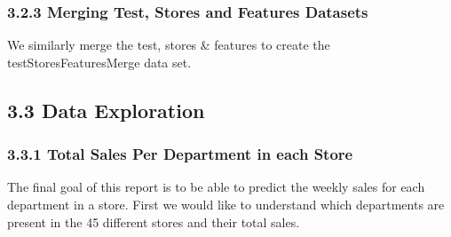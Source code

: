 \documentclass[]{article}
\newenvironment{Shaded}{\begin{snugshade}}{\end{snugshade}}
\newcommand{\KeywordTok}[1]{\textcolor[rgb]{0.13,0.29,0.53}{\textbf{{#1}}}}
\newcommand{\DataTypeTok}[1]{\textcolor[rgb]{0.13,0.29,0.53}{{#1}}}
\newcommand{\DecValTok}[1]{\textcolor[rgb]{0.00,0.00,0.81}{{#1}}}
\newcommand{\StringTok}[1]{\textcolor[rgb]{0.31,0.60,0.02}{{#1}}}
\newcommand{\OtherTok}[1]{\textcolor[rgb]{0.56,0.35,0.01}{{#1}}}
\newcommand{\NormalTok}[1]{{#1}}
\begin{document}
\subsubsection{3.2.3 Merging Test, Stores and Features
Datasets}\label{merging-test-stores-and-features-datasets}

We similarly merge the test, stores \& features to create the
testStoresFeaturesMerge data set.

\begin{Shaded}
\end{Shaded}

\pagebreak

\subsection{3.3 Data Exploration}\label{data-exploration}

\subsubsection{3.3.1 Total Sales Per Department in each
Store}\label{total-sales-per-department-in-each-store}

The final goal of this report is to be able to predict the weekly sales
for each department in a store. First we would like to understand which
departments are present in the 45 different stores and their total
sales.
\end{document}
